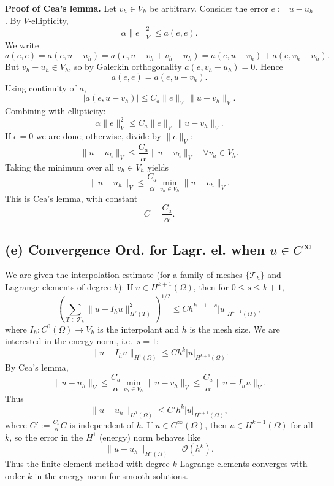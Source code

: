 \textbf{Proof of Cea's lemma.}
Let $v_h \in V_h$ be arbitrary. Consider the error $e := u - u_h$.
By $V$-ellipticity,
\[
  \alpha \|e\|_V^2 \le a(e,e).
\]
We write
\[
  a(e,e) = a(e, u - u_h) = a(e, u - v_h + v_h - u_h)
  = a(e, u - v_h) + a(e, v_h - u_h).
\]
But $v_h - u_h \in V_h$, so by Galerkin orthogonality
$a(e, v_h - u_h) = 0$. Hence
\[
  a(e,e) = a(e, u - v_h).
\]
Using continuity of $a$,
\[
  |a(e, u - v_h)|
  \le C_a \|e\|_V \, \|u - v_h\|_V.
\]
Combining with ellipticity:
\[
  \alpha \|e\|_V^2
  \le C_a \|e\|_V \, \|u - v_h\|_V.
\]
If $e = 0$ we are done; otherwise, divide by $\|e\|_V$:
\[
  \|u - u_h\|_V \le \frac{C_a}{\alpha} \|u - v_h\|_V
  \quad \forall v_h \in V_h.
\]
Taking the minimum over all $v_h \in V_h$ yields
\[
  \boxed{
    \|u - u_h\|_V
    \le \frac{C_a}{\alpha}
    \min_{v_h \in V_h} \|u - v_h\|_V.
  }
\]
This is Cea's lemma, with constant
\[
  C = \frac{C_a}{\alpha}.
\]
\subsection*{(e) Convergence Ord. for Lagr. el. when $u \in C^\infty$}
We are given the interpolation estimate (for a family of meshes $\{ \mathcal{T}_h \}$ and
Lagrange elements of degree $k$):
If $u \in H^{k+1}(\Omega)$, then for $0 \le s \le k+1$,
\[
  \left(
  \sum_{T \in \mathcal{T}_h}
  \|u - I_h u\|_{H^s(T)}^2
  \right)^{1/2}
  \le C h^{k+1 - s} |u|_{H^{k+1}(\Omega)},
\]
where $I_h : C^0(\Omega) \to V_h$ is the interpolant and $h$ is the mesh size.
We are interested in the energy norm, i.e.\ $s = 1$:
\[
  \|u - I_h u\|_{H^1(\Omega)}
  \le C h^{k} |u|_{H^{k+1}(\Omega)}.
\]
By Cea's lemma,
\[
  \|u - u_h\|_V
  \le \frac{C_a}{\alpha} \min_{v_h \in V_h} \|u - v_h\|_V
  \le \frac{C_a}{\alpha} \|u - I_h u\|_V.
\]
Thus
\[
  \|u - u_h\|_{H^1(\Omega)}
  \le C' h^k |u|_{H^{k+1}(\Omega)},
\]
where $C' := \frac{C_a}{\alpha} C$ is independent of $h$.
If $u \in C^\infty(\Omega)$, then $u \in H^{k+1}(\Omega)$ for all $k$, so the
error in the $H^1$ (energy) norm behaves like
\[
  \boxed{
    \|u - u_h\|_{H^1(\Omega)} = \mathcal{O}(h^k).
  }
\]
Thus the finite element method with degree-$k$ Lagrange elements converges
with order $k$ in the energy norm for smooth solutions.
